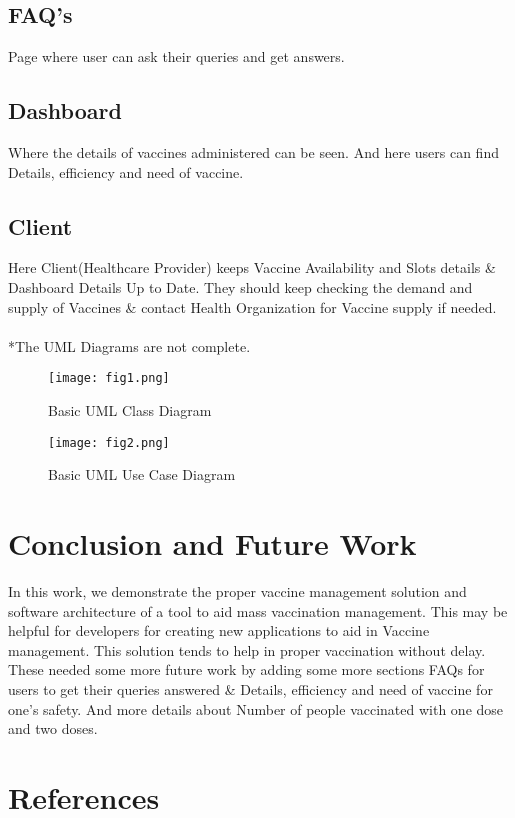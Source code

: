 \documentclass[conference]{IEEEtran}
\begin{document}
 \subsection{FAQ's}
Page where user can ask their queries and get answers.

\subsection{Dashboard}
Where the details of vaccines administered can be seen. And here users can find Details, efficiency and need of vaccine.
\subsection{Client}
Here Client(Healthcare Provider) keeps Vaccine Availability and Slots details \& Dashboard Details Up to Date. They should keep checking the demand and supply of Vaccines \& contact Health Organization for Vaccine supply if needed.
\\
\\
*The UML Diagrams are not complete.

\begin{figure}[htbp]
\centerline{\texttt{[image: fig1.png]}}
\caption{Basic UML Class Diagram}
\label{fig1}
\end{figure}

\begin{figure}[htbp]
\centerline{\texttt{[image: fig2.png]}}
\caption{Basic UML Use Case Diagram}
\label{fig2}
\end{figure}

\section{Conclusion and Future Work}
In this work, we demonstrate the proper vaccine management solution and software architecture of a tool to aid mass vaccination management. This may be helpful for developers for creating new applications to aid in Vaccine management. This solution tends to help in proper vaccination without delay.
These needed some more future work by adding some more sections FAQs for users to get their queries answered \& Details, efficiency and need of vaccine for one's safety. And more details about Number of people vaccinated with one dose and two doses.

\section*{References}
\end{document}
